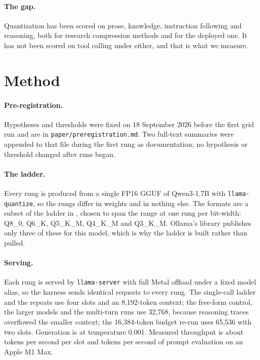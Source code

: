 \documentclass[10pt]{article}
\newcommand{\qm}{Qwen3-1.7B}
\begin{document}
\paragraph{The gap.} Quantization has been scored on prose, knowledge, instruction following and reasoning, both for research compression methods and for the deployed one. It has not been scored on tool calling under either, and that is what we measure.

\section{Method}
\label{sec:method}

\paragraph{Pre-registration.} Hypotheses and thresholds were fixed on 18 September 2026 before the first grid run and are in \texttt{paper/preregistration.md}. Two full-text summaries were appended to that file during the first rung as documentation; no hypothesis or threshold changed after runs began.

\paragraph{The ladder.} Every rung is produced from a single FP16 GGUF of \qm{} \citep{qwen3} with \texttt{llama-quantize}, so the rungs differ in weights and in nothing else. The formats are a subset of the ladder in \citet{kurt2026quant}, chosen to span the range at one rung per bit-width: Q8\_0, Q6\_K, Q5\_K\_M, Q4\_K\_M and Q3\_K\_M. Ollama's library publishes only three of these for this model, which is why the ladder is built rather than pulled.

\paragraph{Serving.} Each rung is served by \texttt{llama-server} with full Metal offload under a fixed model alias, so the harness sends identical requests to every rung. The single-call ladder and the repeats use four slots and an 8{,}192-token context; the free-form control, the larger models and the multi-turn runs use 32{,}768, because reasoning traces overflowed the smaller context; the 16{,}384-token budget re-run uses 65{,}536 with two slots. Generation is at temperature 0.001. Measured throughput is about \qtMacTg{} tokens per second per slot and \qtMacPp{} tokens per second of prompt evaluation on an Apple M1 Max.
\end{document}
